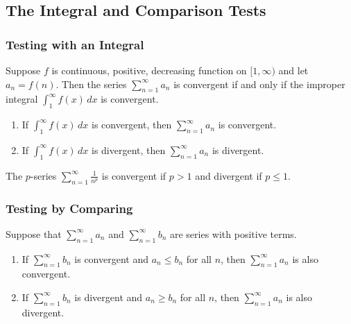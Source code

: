 \subsection{The Integral and Comparison Tests}

\subsubsection*{Testing with an Integral}

\begin{theorem}
    Suppose \(f\) is continuous, positive, decreasing function on
    \([1,\infty)\) and let \(a_n=f(n)\).
    Then the series \(\displaystyle{\sum_{n=1}^\infty a_n}\) is convergent if
    and only if the improper integral
    \(\displaystyle{\int_1^\infty f(x)\,dx}\) is convergent.
    \begin{enumerate}
        \item If \(\displaystyle{\int_1^\infty f(x)\,dx}\) is convergent, then
        \(\displaystyle{\sum_{n=1}^\infty a_n}\) is convergent.
        \item If \(\displaystyle{\int_1^\infty f(x)\,dx}\) is divergent, then
        \(\displaystyle{\sum_{n=1}^\infty a_n}\) is divergent.
    \end{enumerate}
\end{theorem}
The \(p\)-series \(\displaystyle{\sum_{n=1}^\infty \frac{1}{n^p}}\) is
convergent if \(p>1\) and divergent if \(p\leq 1\).

\subsubsection*{Testing by Comparing}

\begin{theorem}
    Suppose that \(\displaystyle{\sum_{n=1}^\infty a_n}\) and
    \(\displaystyle{\sum_{n=1}^\infty b_n}\) are series with positive terms.
    \begin{enumerate}
        \item If \(\displaystyle{\sum_{n=1}^\infty b_n}\) is convergent and
        \(a_n\leq b_n\) for all \(n\), then
        \(\displaystyle{\sum_{n=1}^\infty a_n}\) is also convergent.
        \item If \(\displaystyle{\sum_{n=1}^\infty b_n}\) is divergent and
        \(a_n\geq b_n\) for all \(n\), then
        \(\displaystyle{\sum_{n=1}^\infty a_n}\) is also divergent.
    \end{enumerate}
\end{theorem}